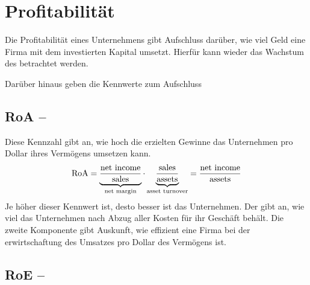 \section{Profitabilität}
Die Profitabilität eines Unternehmens gibt Aufschluss darüber, wie viel Geld eine Firma mit dem investierten Kapital umsetzt.
Hierfür kann wieder das Wachstum des  betrachtet werden.

Darüber hinaus geben die Kennwerte zum  Aufschluss

%
\subsection{RoA -- }

Diese Kennzahl gibt an, wie hoch die erzielten Gewinne das Unternehmen pro Dollar ihres Vermögens umsetzen kann.
\begin{equation}
    \text{RoA} = \underbrace{\frac{\text{net income}}{\text{sales}}}_{\text{net margin}} \cdot \underbrace{\frac{\text{sales}}{\text{assets}}}_{\text{asset turnover}} = \frac{\text{net income}}{\text{assets}}
\end{equation}
Je höher dieser Kennwert ist, desto besser ist das Unternehmen.
Der \netMargin gibt an, wie viel das Unternehmen nach Abzug aller Kosten für ihr Geschäft behält.
Die zweite Komponente \assetTurnover gibt Auskunft, wie effizient eine Firma bei der erwirtschaftung des Umsatzes pro Dollar des Vermögens ist.

%
\subsection{RoE -- }

